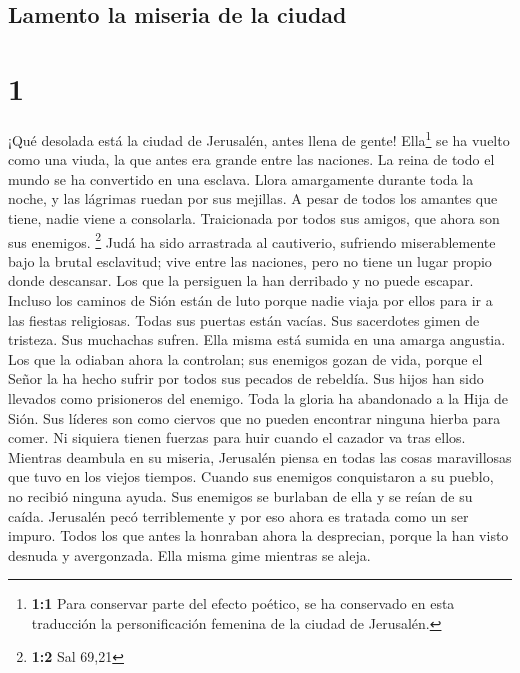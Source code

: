 \hypertarget{lamento-la-miseria-de-la-ciudad}{%
\subsection{Lamento la miseria de la
ciudad}\label{lamento-la-miseria-de-la-ciudad}}

\hypertarget{section}{%
\section{1}\label{section}}

 ¡Qué desolada está la ciudad de Jerusalén, antes llena de
gente! Ella\footnote{\textbf{1:1} Para conservar parte del efecto
  poético, se ha conservado en esta traducción la personificación
  femenina de la ciudad de Jerusalén.} se ha vuelto como una viuda, la
que antes era grande entre las naciones. La reina de todo el mundo se ha
convertido en una esclava.  Llora amargamente durante toda
la noche, y las lágrimas ruedan por sus mejillas. A pesar de todos los
amantes que tiene, nadie viene a consolarla. Traicionada por todos sus
amigos, que ahora son sus enemigos. \footnote{\textbf{1:2} Sal 69,21}
 Judá ha sido arrastrada al cautiverio, sufriendo
miserablemente bajo la brutal esclavitud; vive entre las naciones, pero
no tiene un lugar propio donde descansar. Los que la persiguen la han
derribado y no puede escapar.  Incluso los caminos de Sión
están de luto porque nadie viaja por ellos para ir a las fiestas
religiosas. Todas sus puertas están vacías. Sus sacerdotes gimen de
tristeza. Sus muchachas sufren. Ella misma está sumida en una amarga
angustia.  Los que la odiaban ahora la controlan; sus
enemigos gozan de vida, porque el Señor la ha hecho sufrir por todos sus
pecados de rebeldía. Sus hijos han sido llevados como prisioneros del
enemigo.  Toda la gloria ha abandonado a la Hija de Sión.
Sus líderes son como ciervos que no pueden encontrar ninguna hierba para
comer. Ni siquiera tienen fuerzas para huir cuando el cazador va tras
ellos.  Mientras deambula en su miseria, Jerusalén piensa
en todas las cosas maravillosas que tuvo en los viejos tiempos. Cuando
sus enemigos conquistaron a su pueblo, no recibió ninguna ayuda. Sus
enemigos se burlaban de ella y se reían de su caída. 
Jerusalén pecó terriblemente y por eso ahora es tratada como un ser
impuro. Todos los que antes la honraban ahora la desprecian, porque la
han visto desnuda y avergonzada. Ella misma gime mientras se aleja.
